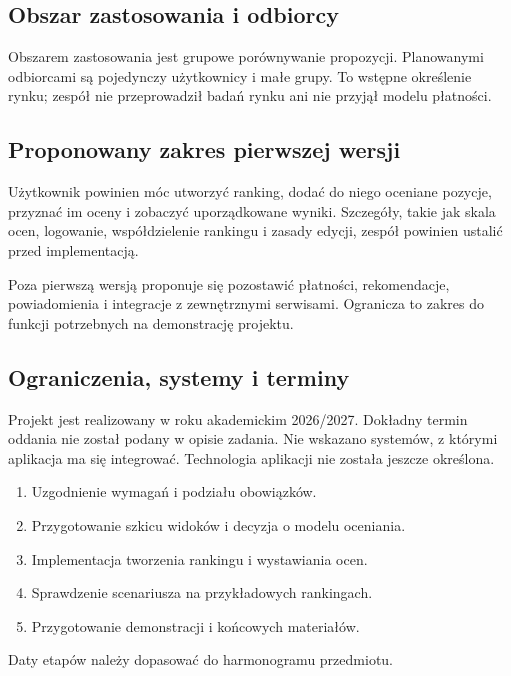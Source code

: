 \documentclass[11pt,a4paper]{article}
\begin{document}
\subsection{Obszar zastosowania i odbiorcy}
Obszarem zastosowania jest grupowe porównywanie propozycji. Planowanymi odbiorcami są pojedynczy użytkownicy i małe grupy. To wstępne określenie rynku; zespół nie przeprowadził badań rynku ani nie przyjął modelu płatności.

\subsection{Proponowany zakres pierwszej wersji}
Użytkownik powinien móc utworzyć ranking, dodać do niego oceniane pozycje, przyznać im oceny i zobaczyć uporządkowane wyniki. Szczegóły, takie jak skala ocen, logowanie, współdzielenie rankingu i zasady edycji, zespół powinien ustalić przed implementacją.

Poza pierwszą wersją proponuje się pozostawić płatności, rekomendacje, powiadomienia i integracje z zewnętrznymi serwisami. Ogranicza to zakres do funkcji potrzebnych na demonstrację projektu.

\subsection{Ograniczenia, systemy i terminy}
Projekt jest realizowany w roku akademickim 2026/2027. Dokładny termin oddania nie został podany w opisie zadania. Nie wskazano systemów, z którymi aplikacja ma się integrować. Technologia aplikacji nie została jeszcze określona.

\begin{enumerate}
  \item Uzgodnienie wymagań i podziału obowiązków.
  \item Przygotowanie szkicu widoków i decyzja o modelu oceniania.
  \item Implementacja tworzenia rankingu i wystawiania ocen.
  \item Sprawdzenie scenariusza na przykładowych rankingach.
  \item Przygotowanie demonstracji i końcowych materiałów.
\end{enumerate}
Daty etapów należy dopasować do harmonogramu przedmiotu.
\end{document}
